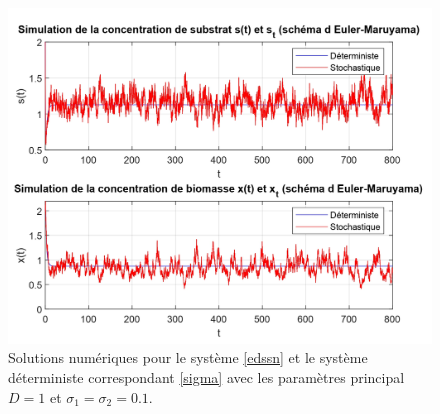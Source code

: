 \documentclass[12pt,a4paper]{report}%
\begin{document}
\begin{figure}[h]
	\centering
	\includegraphics[width=1.05\textwidth]{C2_page-0001.png} 
	\caption{Solutions numériques pour le système \eqref{edssn} et le système déterministe correspondant \eqref{sigma} avec les paramètres principal \( D = 1 \) et $\sigma_1=\sigma_2 = 0.1$.}
	\label{fig:fgure12}
\end{figure}
\end{document}
